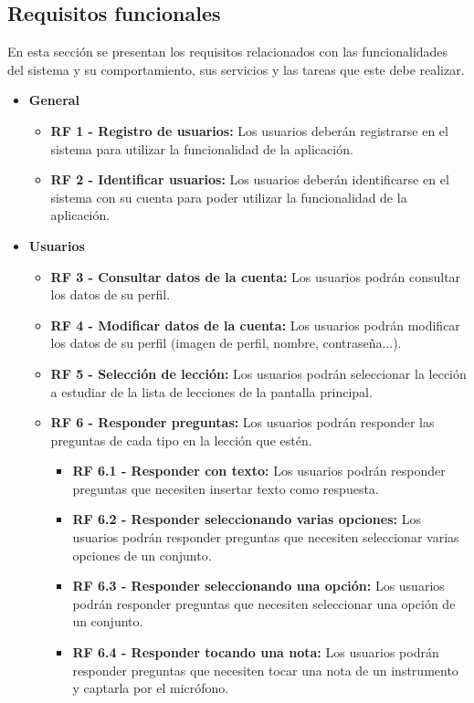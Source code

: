 \subsection{Requisitos funcionales}
En esta sección se presentan los requisitos relacionados con las funcionalidades del sistema y su comportamiento, sus servicios y las tareas que este debe realizar.

\begin{itemize}
    \item \textbf{General}
          \begin{itemize}
              \item \textbf{RF 1 - Registro de usuarios: }Los usuarios deberán registrarse en el sistema para utilizar la funcionalidad de la aplicación.
              \item \textbf{RF 2 - Identificar usuarios: }Los usuarios deberán identificarse en el sistema con su cuenta para poder utilizar la funcionalidad de la aplicación.

          \end{itemize}
    \item \textbf{Usuarios}
          \begin{itemize}
              \item \textbf{RF 3 - Consultar datos de la cuenta: }Los usuarios podrán consultar los datos de su perfil.
              \item \textbf{RF 4 - Modificar datos de la cuenta: }Los usuarios podrán modificar los datos de su perfil (imagen de perfil, nombre, contraseña...).
              \item \textbf{RF 5 - Selección de lección: }Los usuarios podrán seleccionar la lección a estudiar de la lista de lecciones de la pantalla principal.
              \item \textbf{RF 6 - Responder preguntas: }Los usuarios podrán responder las preguntas de cada tipo en la lección que estén.
                    \begin{itemize}
                        \item \textbf{RF 6.1 - Responder con texto: }Los usuarios podrán responder preguntas que necesiten insertar texto como respuesta.
                        \item \textbf{RF 6.2 - Responder seleccionando varias opciones: }Los usuarios podrán responder preguntas que necesiten seleccionar varias opciones de un conjunto.
                        \item \textbf{RF 6.3 - Responder seleccionando una opción: }Los usuarios podrán responder preguntas que necesiten seleccionar una opción de un conjunto.
                        \item \textbf{RF 6.4 - Responder tocando una nota: }Los usuarios podrán responder preguntas que necesiten tocar una nota de un instrumento y captarla por el micrófono.
                    \end{itemize}


\end{itemize}
\end{itemize}

